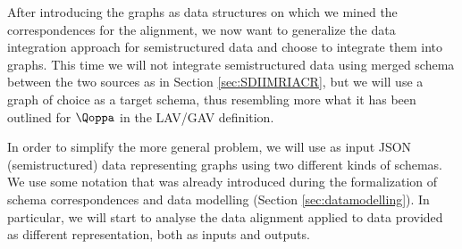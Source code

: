


\label{sss:gdi}
After introducing the graphs as data structures on which we mined the correspondences for the alignment, we now want to generalize the data integration approach for semistructured data and choose to integrate them into  graphs. This time we will not integrate semistructured data using merged schema between the two sources as in Section \vref{sec:SDIIMRIACR}, but we will use a graph of choice as a target schema, thus resembling more what it has been outlined for $\qtransl$ in the LAV/GAV definition. 

In order to simplify the more general problem, we will use as input  JSON (semistructured) data representing graphs using two different kinds of schemas. We use some notation that was already introduced during the formalization of schema correspondences and data modelling (Section \vref{sec:datamodelling}). In particular, we will start to analyse the data alignment applied to data provided as different representation, both as inputs and outputs.


